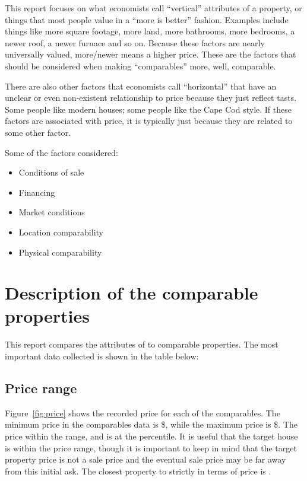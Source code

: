 \documentclass[
10pt, %
a4paper, %
oneside, %
headinclude,footinclude, %
BCOR5mm, %
]{scrartcl}
\begin{document}
This report focuses on what economists call ``vertical'' attributes of a property, or things that most people value in a ``more is better'' fashion.
Examples include things like more square footage, more land, more bathrooms, more bedrooms, a newer roof, a newer furnace and so on.
Because these factors are nearly universally valued, more/newer means a higher price.
These are the factors that should be considered when making ``comparables'' more, well, comparable. 

There are also other factors that economists call ``horizontal'' that have an unclear or even non-existent relationship to price because they just reflect tasts.  
Some people like modern houses; some people like the Cape Cod style.
If these factors are associated with price, it is typically just because they are related to some other factor.

Some of the factors considered: 
\begin{itemize}
\item Conditions of sale
\item Financing
\item Market conditions
\item Location comparability
\item Physical comparability 
\end{itemize}

\section{Description of the comparable properties}
This report compares the attributes of \PropertyName{} to \NumberOfComps{} comparable properties.
The most important data collected is shown in the table below:



\subsection{Price range} 
Figure~\ref{fig:price} shows the recorded price for each of the comparables.
The minimum price in the comparables data is \$\MinPrice{}, while the maximum price is \$\MaxPrice{}.
The \PropertyName{} price \InPriceRange{} within the range, and is at the \PricePercentile{} percentile.
It is useful that the target house is within the price range, though it is important to keep in mind that the target property price is not a sale price and the eventual sale price may be far away from this initial ask. 
The closest property to \PropertyName{} strictly in terms of price is \ClosestOnPrice{}. 
\end{document}
